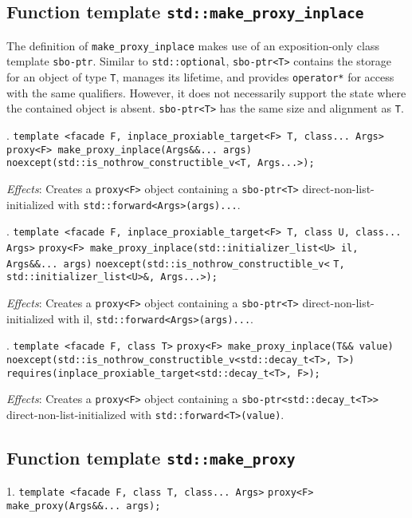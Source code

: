 \documentclass[10pt, a4paper, oneside]{article}
\begin{document}
\subsection{Function template \texttt{std::make\_proxy\_inplace}}
The definition of \verb|make_proxy_inplace| makes use of an exposition-only class template \verb|sbo-ptr|.
Similar to \verb|std::optional|, \verb|sbo-ptr<T>| contains the storage for an object of type \verb|T|, manages its lifetime,
and provides \verb|operator*| for access with the same qualifiers.
However, it does not necessarily support the state where the contained object is absent.
\verb|sbo-ptr<T>| has the same size and alignment as \verb|T|.\medbreak

. \verb|template <facade F, inplace_proxiable_target<F> T, class... Args>|\smallbreak
\indent \verb|proxy<F> make_proxy_inplace(Args&&... args)|\smallbreak
\indent \indent \verb|noexcept(std::is_nothrow_constructible_v<T, Args...>);|

\textit{Effects}: Creates a \verb|proxy<F>| object containing a \verb|sbo-ptr<T>| direct-non-list-initialized with \smallbreak
\verb|std::forward<Args>(args)...|.
\medbreak

. \verb|template <facade F, inplace_proxiable_target<F> T, class U, class... Args>|\smallbreak
\indent \verb|proxy<F> make_proxy_inplace(std::initializer_list<U> il, Args&&... args)|\smallbreak
\indent \indent \verb|noexcept(std::is_nothrow_constructible_v<|\smallbreak
\indent \indent \indent \verb|T, std::initializer_list<U>&, Args...>);|

\textit{Effects}: Creates a \verb|proxy<F>| object containing a \verb|sbo-ptr<T>| direct-non-list-initialized with il, \smallbreak
\verb|std::forward<Args>(args)...|.
\medbreak

. \verb|template <facade F, class T>|\smallbreak
\indent \verb|proxy<F> make_proxy_inplace(T&& value)|\smallbreak
\indent \indent \verb|noexcept(std::is_nothrow_constructible_v<std::decay_t<T>, T>)|\smallbreak
\indent \indent \verb|requires(inplace_proxiable_target<std::decay_t<T>, F>);|

\textit{Effects}: Creates a \verb|proxy<F>| object containing a \verb|sbo-ptr<std::decay_t<T>>| direct-non-list-initialized with \verb|std::forward<T>(value)|.

\subsection{Function template \texttt{std::make\_proxy}}
1. \verb|template <facade F, class T, class... Args>|\smallbreak
\indent \verb|proxy<F> make_proxy(Args&&... args);|
\end{document}
